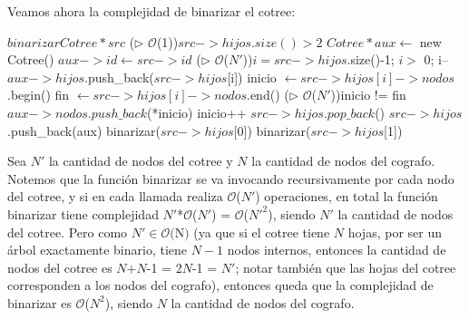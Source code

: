 Veamos ahora la complejidad de binarizar el cotree: \\
\begin{algoritmo}{$binarizar$}{$Cotree* src$}{}
	\If(\hfill {$\triangleright$ $\mathcal{O}$(1)}){$src->hijos.size() > 2$} {
    	$Cotree* aux \gets$ new Cotree() 
    	$aux->id \gets src->id$ 
        \For(\hfill {$\triangleright$ $\mathcal{O}$($N'$)}){$i = src->hijos$.size()-1; $i >$ 0; i--} {
        	$aux->hijos$.push\_back($src->hijos$[i]) 
             inicio $\gets src->hijos[i]->nodos$.begin() 
             fin $\gets src->hijos[i]->nodos$.end() 
            \While(\hfill {$\triangleright$ $\mathcal{O}$($N'$)}){inicio != fin} {
              $aux->nodos.push\_back$(*inicio) 
              inicio++ 
            }
            $src->hijos.pop\_back$() 
        }
        $src->hijos$.push\_back(aux) 
        binarizar($src->hijos$[0]) 
        binarizar($src->hijos$[1]) 
    } 
\end{algoritmo}
Sea $N'$ la cantidad de nodos del cotree y $N$ la cantidad de nodos del cografo. Notemos que la función binarizar se va invocando recursivamente por cada nodo del cotree, y si en cada llamada realiza $\mathcal{O}$($N'$) operaciones, en total la función binarizar tiene complejidad $N'$*$\mathcal{O}$($N'$) = $\mathcal{O}$($N'^2$), siendo $N'$ la cantidad de nodos del cotree. Pero como $N' \in \mathcal{O}($N$)$ (ya que si el cotree tiene $N$ hojas, por ser un árbol exactamente binario, tiene $N-1$ nodos internos, entonces la cantidad de nodos del cotree es $N$+$N$-1 = 2$N$-1 = $N'$; notar también que las hojas del cotree corresponden a los nodos del cografo), entonces queda que la complejidad de binarizar es $\mathcal{O}$($N^2$), siendo $N$ la cantidad de nodos del cografo. \\

